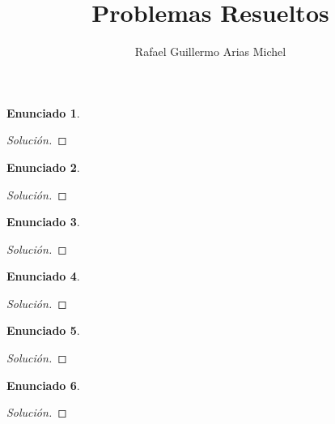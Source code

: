 \documentclass{article}
\title{Problemas Resueltos}
\author{Rafael Guillermo Arias Michel}
\date{\displaydate{fecha}}
\theoremstyle{definition}
\newtheorem{enunciado}{Enunciado}
\newenvironment{ejercicio}{\begin{enunciado}}{\end{enunciado}}
\newenvironment{solucion}{\begin{proof}[Solución]}{\end{proof}}
\begin{document}
	\maketitle

	\begin{ejercicio}\end{ejercicio}
	\begin{solucion}\end{solucion}

	\begin{ejercicio}\end{ejercicio}
	\begin{solucion}\end{solucion}

	\begin{ejercicio}\end{ejercicio}
	\begin{solucion}\end{solucion}

	\begin{ejercicio}\end{ejercicio}
	\begin{solucion}\end{solucion}

	\begin{ejercicio}\end{ejercicio}
	\begin{solucion}\end{solucion}

	\begin{ejercicio}\end{ejercicio}
	\begin{solucion}\end{solucion}
\end{document}
